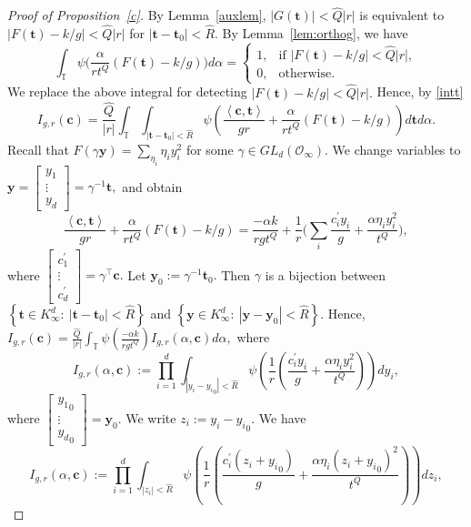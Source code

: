 \documentclass[11pt]{amsart}
\theoremstyle{plain}
\theoremstyle{plain}
\renewcommand{\vec}[1]{\mathbf{#1}}
\theoremstyle{remark}
\theoremstyle{definition}
\newcommand{\hQ}{\widehat{Q}}
\newcommand{\hR}{\widehat{R}}
\newcommand{\TT}{\mathbb{T}}
\newcommand{\cO}{\mathcal{O}}
\begin{document}
\begin{proof}[Proof of Proposition~\ref{c}]
By Lemma~\ref{auxlem},  $|G(\vec{t})| < \hQ|r|$ is equivalent to $|F(\vec{t})-k/g|<\hQ |r|$ for $|\vec{t}-\vec{t}_0|<\hR.$ By Lemma~\ref{lem:orthog}, we have 
$$
\int_{\TT} \psi\Big(\frac{\alpha} {rt^Q } (F(\vec{t})-k/g)\Big) d \alpha=\begin{cases}
 1, &\mbox{if $|F(\vec{t})-k/g|< \hQ|r|$},\\
0, &\mbox{otherwise.}
\end{cases}
$$
We replace the above integral for detecting $|F(\vec{t})-k/g|< \hQ|r|.$ Hence, by \eqref{intt}
\[
I_{g,r}(\vec{c})=\frac{\hQ}{|r|} \int _{\TT}\int_{|\vec{t}-\vec{t}_0| <\hR}\psi\left(\frac{\left< \vec{c},\vec{t} \right>}{gr} +\frac{\alpha} {rt^Q } (F(\vec{t})-k/g)   \right) d\vec{t} d\alpha.\]
Recall  that $F(\gamma\vec{y})=\sum_{\eta_i} \eta_iy_i^2$ for some  $\gamma\in GL_d(\cO_{\infty}).$  We change  variables to $\vec{y}=\begin{bmatrix}y_1 \\ \vdots \\y_d  \end{bmatrix}=\gamma^{-1} \vec{t},$ and obtain 
 \[
\frac{\left< \vec{c},\vec{t} \right>}{gr} +\frac{\alpha} {rt^Q } (F(\vec{t})-k/g)=\frac{-\alpha k}{rgt^Q}+ \frac{1}{r} \Big(\sum_{i} \frac{c_i^{\prime}y_i}{g} +\frac{\alpha  \eta_i y_i^2}{t^Q}   \big),
 \]
 where $\begin{bmatrix}c_1^{\prime} \\ \vdots \\c_d^{\prime}  \end{bmatrix}=\gamma^{\intercal } \vec{c}.$ Let $\vec{y}_0:= \gamma^{-1}\vec{t}_0.$ Then 
 $\gamma$ is a bijection between  $\left\{\vec{t}\in K_\infty^d: \ |\vec{t}-\vec{t}_0|<\hR  \right\}$ and  $\left\{\vec{y}\in K_\infty^d: \ |\vec{y}-\vec{y}_0|<\hR  \right\}.$
 Hence,
 \(
I_{g,r}(\vec{c})=\frac{\hQ}{|r|} \int _{\TT} \psi(\frac{-\alpha k}{rgt^Q})  I_{g,r}(\alpha,\vec{c})d\alpha,\)
where 
\[
I_{g,r}(\alpha,\vec{c}):=\prod_{i=1}^{d}\int_{|y_i-{y_i}_0|<\hR} \psi \left( \frac{1}{r} \left( \frac{c_i^{\prime}y_i}{g} +\frac{\alpha  \eta_i y_i^2}{t^Q}   \right)\right) dy_i,
 \]
 where $\begin{bmatrix}{y_1}_0 \\ \vdots \\{y_d}_0 \end{bmatrix}=\vec{y}_0.$ We write $z_i:=y_i-{y_i}_0.$ We have  
 \[
I_{g,r}(\alpha,\vec{c}):=\prod_{i=1}^{d}\int_{|z_i|<\hR} \psi \left( \frac{1}{r} \left( \frac{c_i^{\prime}(z_i+{y_i}_0)}{g} +\frac{\alpha  \eta_i (z_i+{y_i}_0)^2}{t^Q}   \right)\right) dz_i,
\]
\end{proof}
\end{document}

